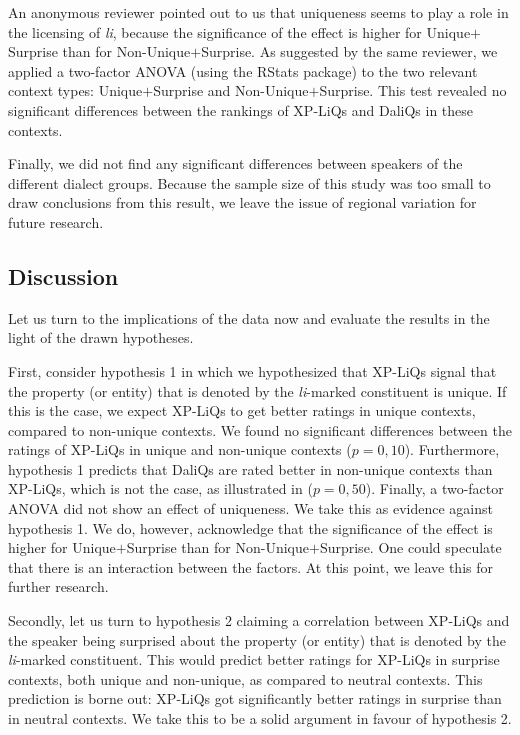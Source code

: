 \documentclass[output=paper,
colorlinks,
citecolor=brown,
newtxmath
]{langscibook}
\begin{document}
An anonymous reviewer pointed out to us that uniqueness seems to play a role in the licensing of \textit{li}, because the significance of the effect is higher for Unique$+$Surprise than for
Non-Unique$+$Surprise. As suggested by the same reviewer, we applied a two-factor ANOVA (using the RStats package) to the two relevant context types: Unique$+$Surprise and Non-Unique$+$Surprise. This test revealed no significant differences between the rankings of XP-LiQs and DaliQs in these contexts.

Finally, we did not find any significant differences between speakers of the different dialect groups. Because the sample size of this study was too small to draw conclusions from this result, we leave the issue of regional variation for future research.


\subsection{Discussion}\label{sec:discussion}
Let us turn to the implications of the data now and evaluate the results in the light of the drawn hypotheses.

First, consider hypothesis 1 in which we hypothesized that XP-LiQs signal that the property (or entity) that is denoted by the \textit{li}-marked constituent is unique. If this is the case, we expect XP-LiQs to get better ratings in unique contexts, compared to non-unique contexts. We found no significant differences between the ratings of XP-LiQs in unique and non-unique contexts ($p=0,10$). Furthermore, hypothesis 1 predicts that DaliQs are rated better in non-unique contexts than XP-LiQs, which is not the case, as illustrated in  ($p=0,50$). Finally, a two-factor ANOVA did not show an effect of uniqueness. We take this as evidence against hypothesis 1. We do, however, acknowledge that the significance of the effect is higher for Unique$+$Surprise than for Non-Unique$+$Surprise. One could speculate that there is an interaction between the factors. At this point, we leave this for further research.

Secondly, let us turn to hypothesis 2 claiming a correlation between XP-LiQs and the speaker being surprised about the property (or entity) that is denoted by the \textit{li}-marked constituent. This would predict better ratings for XP-LiQs in surprise contexts, both unique and non-unique, as compared to neutral contexts. This prediction is borne out: XP-LiQs got significantly better ratings in surprise than in neutral contexts. We take this to be a solid argument in favour of hypothesis 2.
\end{document}
